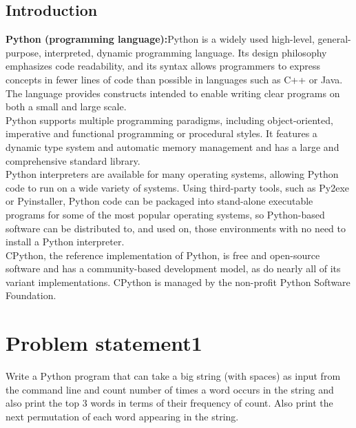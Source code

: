 \documentclass[12pt]{article}
\begin{document}
\newpage %
\large{
\begin{center}
\listoffigures
\end{center}

\newpage
\begin{center}
\section{Introduction} %
\end{center}
\textbf{Python (programming language):}Python is a widely used high-level, general-purpose, interpreted, dynamic programming language. Its design philosophy emphasizes code readability, and its syntax allows programmers to express concepts in fewer lines of code than possible in languages such as C++ or Java. The language provides constructs intended to enable writing clear programs on both a small and large scale.\\
Python supports multiple programming paradigms, including object-oriented, imperative and functional programming or procedural styles. It features a dynamic type system and automatic memory management and has a large and comprehensive standard library.\\Python interpreters are available for many operating systems, allowing Python code to run on a wide variety of systems. Using third-party tools, such as Py2exe or Pyinstaller, Python code can be packaged into stand-alone executable programs for some of the most popular operating systems, so Python-based software can be distributed to, and used on, those environments with no need to install a Python interpreter.\\CPython, the reference implementation of Python, is free and open-source software and has a community-based development model, as do nearly all of its variant implementations. CPython is managed by the non-profit Python Software Foundation.





\newpage
\section{Problem statement1} %
Write a Python program that can take a big string (with spaces) as input from the command line and count number of times a word occurs in the string and also print the top 3 words in terms of their frequency of count.
Also print the next permutation of each word appearing in the string.

}
\end{document}

